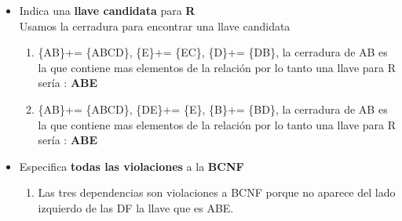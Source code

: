 \documentclass{article}
\begin{document}
\begin{enumerate}
\begin{itemize}
\begin{enumerate}
		
		
	\end{enumerate}
	\item Indica una \textbf{llave candidata} para \textbf{R} \\
	Usamos la cerradura para encontrar una llave candidata
	\begin{enumerate}
		\item \{AB\}+= \{ABCD\}, \{E\}+= \{EC\}, \{D\}+= \{DB\}, la cerradura de AB es la que contiene mas elementos de la relación por lo tanto una llave para R sería : \textbf{ABE}\\ 
		\item \{AB\}+= \{ABCD\}, \{DE\}+= \{E\}, \{B\}+= \{BD\}, la cerradura de AB es la que contiene mas elementos de la relación por lo tanto una llave para R sería : \textbf{ABE}\\ 
		
		
		
	\end{enumerate}
	
	\item Especifica \textbf{todas las violaciones}  a la \textbf{BCNF}\\
	\begin{enumerate}
		\item Las tres dependencias son violaciones a BCNF porque no aparece del lado izquierdo de las DF la llave que es ABE.\\
		

\end{enumerate}
\end{itemize}
\end{enumerate}
\end{document}
